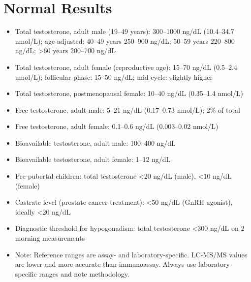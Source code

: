 \section*{Normal Results}
\begin{itemize}
  \item Total testosterone, adult male (19--49 years): 300--1000 ng/dL (10.4--34.7 nmol/L); age-adjusted: 40--49 years 250--900 ng/dL; 50--59 years 220--800 ng/dL; >60 years 200--700 ng/dL
  \item Total testosterone, adult female (reproductive age): 15--70 ng/dL (0.5--2.4 nmol/L); follicular phase: 15--50 ng/dL; mid-cycle: slightly higher
  \item Total testosterone, postmenopausal female: 10--40 ng/dL (0.35--1.4 nmol/L)
  \item Free testosterone, adult male: 5--21 ng/dL (0.17--0.73 nmol/L); 2\% of total
  \item Free testosterone, adult female: 0.1--0.6 ng/dL (0.003--0.02 nmol/L)
  \item Bioavailable testosterone, adult male: 100--400 ng/dL
  \item Bioavailable testosterone, adult female: 1--12 ng/dL
  \item Pre-pubertal children: total testosterone <20 ng/dL (male), <10 ng/dL (female)
  \item Castrate level (prostate cancer treatment): <50 ng/dL (GnRH agonist), ideally <20 ng/dL
  \item Diagnostic threshold for hypogonadism: total testosterone <300 ng/dL on 2 morning measurements
  \item Note: Reference ranges are assay- and laboratory-specific. LC-MS/MS values are lower and more accurate than immunoassay. Always use laboratory-specific ranges and note methodology.
\end{itemize}

